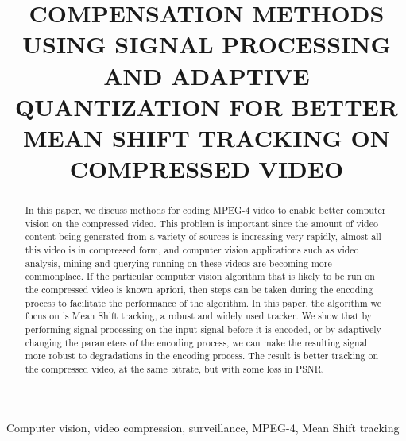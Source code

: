 \documentclass{article}
\title{COMPENSATION METHODS USING SIGNAL PROCESSING AND ADAPTIVE QUANTIZATION FOR BETTER MEAN SHIFT TRACKING ON COMPRESSED VIDEO}
\begin{document}
%
\maketitle
%
\begin{abstract}
In this paper, we discuss methods for coding MPEG-4 video to enable better computer vision on the compressed video. This problem is important since the amount of video content being generated from a variety of sources is increasing very rapidly, almost all this video is in compressed form, and computer vision applications such as video analysis, mining and querying running on these videos are becoming more commonplace.  If the particular computer vision algorithm that is likely to be run on the compressed video is known apriori, then steps can be taken during the encoding process to facilitate the performance of the algorithm.  In this paper, the algorithm we focus on is Mean Shift tracking, a robust and widely used tracker.  We show that by performing signal processing on the input signal before it is encoded, or by adaptively changing the parameters of the encoding process, we can make the resulting signal more robust to degradations in the encoding process.  The result is better tracking on the compressed video, at the same bitrate, but with some loss in PSNR.
\end{abstract}

\begin{keywords}
Computer vision, video compression, surveillance, MPEG-4, Mean Shift tracking
\end{keywords}


\end{document}
